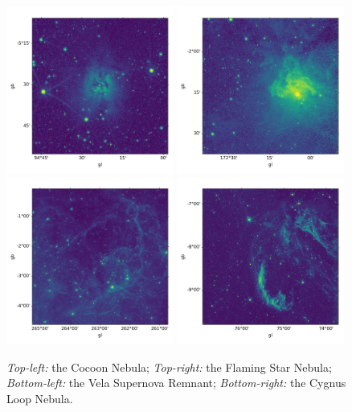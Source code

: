 \documentclass[12pt, preprint]{aastex}
\begin{document}
\begin{figure}[p]
\begin{center}
\includegraphics[width=0.49\textwidth]{figures/cocoon}
\includegraphics[width=0.49\textwidth]{figures/FlamingStar}
\includegraphics[width=0.49\textwidth]{figures/Vela}
\includegraphics[width=0.49\textwidth]{figures/cygnusloop}
\end{center}
\caption{
  \label{map1}
   \emph{Top-left:}  the Cocoon Nebula;
   \emph{Top-right:} the Flaming Star Nebula;
   \emph{Bottom-left:} the Vela Supernova Remnant;
   \emph{Bottom-right:} the Cygnus Loop Nebula.
}
\end{figure}
\end{document}
